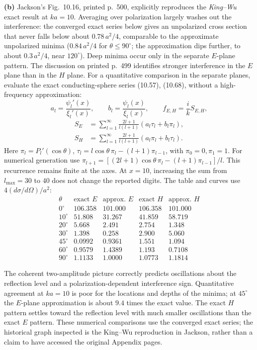 \textbf{(b)} Jackson's Fig.~10.16, printed p.~500, explicitly reproduces
the \emph{King--Wu} exact result at $ka=10$. Averaging over polarization
largely washes out the interference: the converged exact series below
gives an unpolarized cross section that never falls below about
$0.78\,a^2/4$, comparable to the approximate unpolarized minima
($0.84\,a^2/4$ for $\theta\le90^\circ$; the approximation dips further,
to about $0.3\,a^2/4$, near $120^\circ$). Deep minima occur only in the
separate $E$-plane pattern. The discussion on printed p.~499 identifies stronger interference
in the $E$ plane than in the $H$ plane. For a quantitative comparison
in the separate planes, evaluate the exact conducting-sphere series
(10.57), (10.68), without a high-frequency approximation:
\[
a_l=\frac{\psi_l'(x)}{\xi_l'(x)},\qquad
b_l=\frac{\psi_l(x)}{\xi_l(x)},\qquad
f_{E,H}=\frac{i}{k}S_{E,H},
\]
\[
\begin{split}
S_E&=\sum_{l=1}^\infty\frac{2l+1}{l(l+1)}
(a_l\tau_l+b_l\pi_l),\\
S_H&=\sum_{l=1}^\infty\frac{2l+1}{l(l+1)}
(a_l\pi_l+b_l\tau_l).
\end{split}
\]
Here $\pi_l=P_l'(\cos\theta)$,
$\tau_l=l\cos\theta\,\pi_l-(l+1)\pi_{l-1}$, with $\pi_0=0,\pi_1=1$.
For numerical generation use
$\pi_{l+1}=[(2l+1)\cos\theta\,\pi_l-(l+1)\pi_{l-1}]/l$.
This recurrence remains finite at the axes. At $x=10$, increasing the
sum from $l_{\max}=30$ to $40$ does not change the reported digits.
The table and curves use $4(d\sigma/d\Omega)/a^2$:
\[
\begin{array}{r|rr|rr}
\theta&\text{exact }E&\text{approx. }E&
\text{exact }H&\text{approx. }H\\ \hline
0^\circ&106.358&101.000&106.358&101.000\\
10^\circ&51.808&31.267&41.859&58.719\\
20^\circ&5.668&2.491&2.754&1.348\\
30^\circ&1.398&0.258&2.900&5.060\\
45^\circ&0.0992&0.9361&1.551&1.094\\
60^\circ&0.9579&1.4389&1.193&0.7108\\
90^\circ&1.1133&1.0000&1.0773&1.1814
\end{array}
\]
\begin{center}\end{center}
The coherent two-amplitude picture correctly predicts oscillations about
the reflection level and a polarization-dependent interference sign.
Quantitative agreement at $ka=10$ is poor for the locations and depths
of the minima; at $45^\circ$ the $E$-plane approximation is about
$9.4$ times the exact value. The exact $H$ pattern settles toward the
reflection level with much smaller oscillations than the exact $E$ pattern.
These numerical comparisons use the converged exact series; the
historical graph inspected is the King--Wu reproduction in Jackson,
rather than a claim to have accessed the original Appendix pages.


